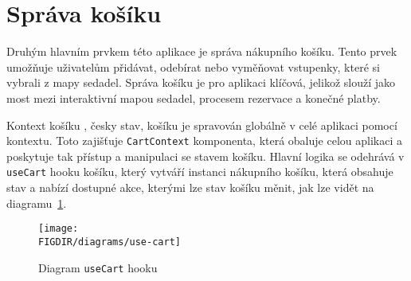 \section{Správa košíku}
\label{sec:implementace-kosik}
Druhým hlavním prvkem této aplikace je správa nákupního košíku.
Tento prvek umožňuje uživatelům přidávat, odebírat nebo vyměňovat vstupenky, které si vybrali z mapy sedadel.
Správa košíku je pro aplikaci klíčová, jelikož slouží jako most mezi interaktivní mapou sedadel, procesem rezervace a konečné platby.

\begin{subsection}{Kontext košíku}
    \label{subsec:implementace-kosik-kontext}
    , česky stav, košíku je spravován globálně v celé aplikaci pomocí kontextu.
    Toto zajišťuje \texttt{CartContext} komponenta, která obaluje celou aplikaci a poskytuje tak přístup a manipulaci se stavem košíku.
    Hlavní logika se odehrává v \texttt{useCart} hooku košíku, který vytváří instanci nákupního košíku, která obsahuje stav a nabízí dostupné akce, kterými lze stav košíku měnit, jak lze vidět na diagramu~\ref{fig:cart-context-diagram}.

    \begin{figure}[H]
        \centering
        \texttt{[image: \\FIGDIR/diagrams/use-cart]}
        \caption{Diagram \texttt{useCart} hooku}
        \label{fig:cart-context-diagram}
    \end{figure}
\end{subsection}

